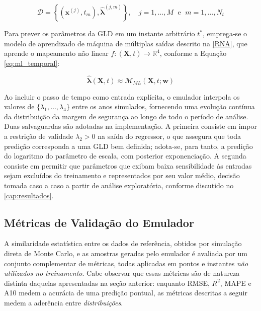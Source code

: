 \begin{equation}\label{eq:dataset_temporal}
\mathcal{D} = \left\{ \left( \mathbf{x}^{(j)}, t_m \right), \hat{\boldsymbol{\lambda}}^{(j, m)} \right\}, \quad j=1,\dots,M \;\text{ e }\; m=1,\dots,N_t
\end{equation}

Para prever os parâmetros da GLD em um instante arbitrário $t^{*}$, emprega-se o modelo de aprendizado de máquina de múltiplas saídas descrito na \autoref{RNA}, que aprende o mapeamento não linear $f: (\mathbf{X}, t) \to \mathbb{R}^4$, conforme a Equação \eqref{eq:ml_temporal}:

\begin{equation}\label{eq:ml_temporal}
\hat{\boldsymbol{\lambda}}(\mathbf{X}, t) \approx \mathcal{M}_{ML}(\mathbf{X}, t; \mathbf{w})
\end{equation}

Ao incluir o passo de tempo como entrada explícita, o emulador interpola os valores de $\{\lambda_1, \dots, \lambda_4\}$ entre os anos simulados, fornecendo uma evolução contínua da distribuição da margem de segurança ao longo de todo o período de análise. Duas salvaguardas são adotadas na implementação. A primeira consiste em impor a restrição de validade $\lambda_2 > 0$ na saída do regressor, o que assegura que toda predição corresponda a uma GLD bem definida; adota-se, para tanto, a predição do logaritmo do parâmetro de escala, com posterior exponenciação. A segunda consiste em permitir que parâmetros que exibam baixa sensibilidade às entradas sejam excluídos do treinamento e representados por seu valor médio, decisão tomada caso a caso a partir de análise exploratória, conforme discutido no \autoref{cap:resultados}.

\subsection{Métricas de Validação do Emulador}
\label{sec:metricas_emulador}

A similaridade estatística entre os dados de referência, obtidos por simulação direta de Monte Carlo, e as amostras geradas pelo emulador é avaliada por um conjunto complementar de métricas, todas aplicadas em pontos e instantes \textit{não utilizados no treinamento}. Cabe observar que essas métricas são de natureza distinta daquelas apresentadas na seção anterior: enquanto RMSE, $R^2$, MAPE e A10 medem a acurácia de uma predição pontual, as métricas descritas a seguir medem a aderência entre \textit{distribuições}.


